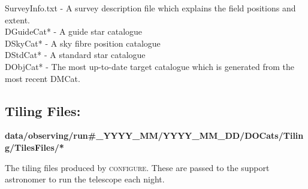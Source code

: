 \documentclass[12pt]{article}
\begin{document}
SurveyInfo.txt - A survey description file which explains the field positions and extent.\\
DGuideCat* - A guide star catalogue \\
DSkyCat* - A sky fibre position catalogue \\
DStdCat* - A standard star catalogue \\
DObjCat* - The most up-to-date target catalogue which is generated from the most recent DMCat. \\
 
 
\subsection{Tiling Files:}

 \textbf{data/observing/run\#\_YYYY\_MM/YYYY\_MM\_DD/DOCats/Tiling/TilesFiles/*}
 
 The tiling files produced by \textsc{configure}. These are passed to the support astronomer to run the telescope each night.   
\end{document}
